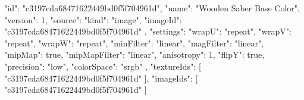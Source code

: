 {
  "id": "c3197cda68471622449bd0f5f704961d",
  "name": "Wooden Saber Base Color",
  "version": 1,
  "source": {
    "kind": "image",
    "imageId": "c3197cda68471622449bd0f5f704961d"
  },
  "settings": {
    "wrapU": "repeat",
    "wrapV": "repeat",
    "wrapW": "repeat",
    "minFilter": "linear",
    "magFilter": "linear",
    "mipMap": true,
    "mipMapFilter": "linear",
    "anisotropy": 1,
    "flipY": true,
    "precision": "low",
    "colorSpace": "srgb"
  },
  "textureIds": [
    "c3197cda68471622449bd0f5f704961d"
  ],
  "imageIds": [
    "c3197cda68471622449bd0f5f704961d"
  ]
}

